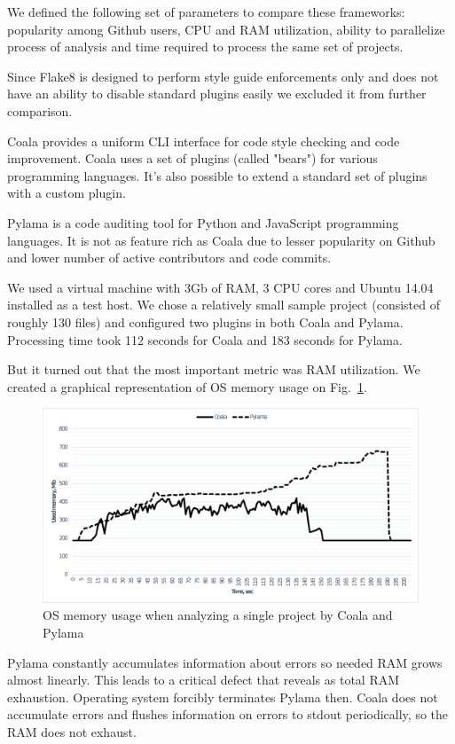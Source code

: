 \documentclass[runningheads,a4paper]{llncs}
\begin{document}
We defined the following set of parameters to compare these frameworks:
popularity among Github \cite{item16} users, CPU and RAM utilization, ability to
parallelize process of analysis and time required to process the same set of projects.

Since Flake8 is designed to perform style guide enforcements only and does not
have an ability to disable standard plugins easily we excluded it from further comparison.

Coala provides a uniform CLI interface for code style checking and code
improvement. Coala uses a set of plugins (called "bears") for various
programming languages. It's also possible to extend a standard set of
plugins with a custom plugin.

Pylama is a code auditing tool for Python and JavaScript programming
languages. It is not as feature rich as Coala due to lesser popularity
on Github and lower number of active contributors and code commits.

We used a virtual machine with 3Gb of RAM, 3 CPU cores and Ubuntu 14.04
installed as a test host. We chose a relatively small sample project (consisted
of roughly 130 files) and configured two plugins in both Coala and Pylama.
Processing time took 112 seconds for Coala and 183 seconds for Pylama.

But it turned out that the most important metric was RAM utilization. We created
a graphical representation of OS memory usage on Fig.~\ref{fig:memusage}.

%
\begin{figure}
	\centering
	\includegraphics[width=\linewidth]{memusage}
	\caption{OS memory usage when analyzing a single project by Coala and Pylama}
	\label{fig:memusage}
\end{figure}
%

Pylama constantly accumulates information about errors so needed RAM grows
almost linearly. This leads to a critical defect that reveals as total RAM
exhaustion. Operating system forcibly terminates Pylama then. Coala does not
accumulate errors and flushes information on errors to stdout periodically, so
the RAM does not exhaust.
\end{document}

